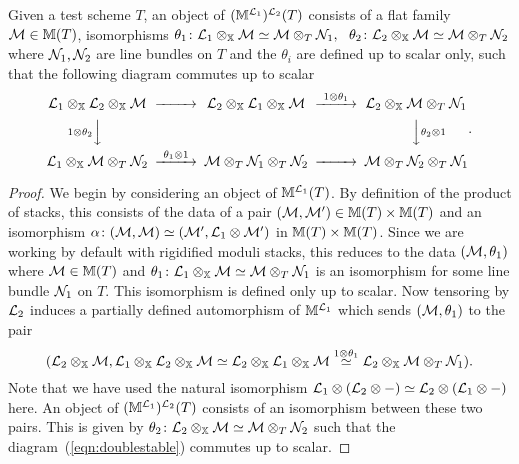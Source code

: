 \documentclass[12pt]{amsart}
\begin{document}
\begin{proposition}  \label{prop:doublestable}
Given a test scheme $T$, an object of $(\mathbb{M}^{\mathcal{L}_1})^{\mathcal{L}_2}(T)$ consists of a flat family $\mathcal{M} \in \mathbb{M}(T)$, isomorphisms $\theta_1 \colon \mathcal{L}_1 \otimes_{\mathbb{X}} \mathcal{M} \simeq \mathcal{M} \otimes_T \mathcal{N}_1, \ \ \theta_2 \colon \mathcal{L}_2 \otimes_{\mathbb{X}} \mathcal{M} \simeq \mathcal{M} \otimes_T \mathcal{N}_2$ where $\mathcal{N}_1, \mathcal{N}_2$ are line bundles on $T$ and the $\theta_i$ are defined up to scalar only, such that the following diagram commutes up to scalar
\begin{equation} \label{eqn:doublestable}
\begin{CD}
\cL_1 \otimes_{\bX} \cL_2 \otimes_{\bX} \cM @>>> \cL_2 \otimes_{\bX} \cL_1 \otimes_{\bX} \cM @>{1 \otimes \theta_1}>> \cL_2 \otimes_{\bX} \cM \otimes_T \cN_1 \\
@V{1 \otimes \theta_2}VV @. @VV{\theta_2 \otimes 1}V \\
\cL_1 \otimes_{\bX} \cM \otimes_T \cN_2 @>{\theta_1 \otimes 1}>> \cM \otimes_T \cN_1 \otimes_T \cN_2 @>>> 
\cM \otimes_T \cN_2 \otimes_T \cN_1
\end{CD}.
\end{equation}
\end{proposition}
\begin{proof}
We begin by considering an object of $\mathbb{M}^{\mathcal{L}_1}(T)$. By definition of the product of stacks, this consists of the data of a pair $(\mathcal{M}, \mathcal{M}') \in \mathbb{M}(T) \times\mathbb{M}(T)$ and an isomorphism $\alpha \colon (\mathcal{M}, \mathcal{M}) \simeq (\mathcal{M}', \mathcal{L}_1 \otimes \mathcal{M}')$ in $\mathbb{M}(T) \times \mathbb{M}(T)$. Since we are working by default with rigidified moduli stacks, this reduces to the data $(\mathcal{M}, \theta_1)$ where $\mathcal{M} \in \mathbb{M}(T)$ and $\theta_1 \colon \mathcal{L}_1 \otimes_{\mathbb{X}} \mathcal{M} \simeq \mathcal{M} \otimes_T \mathcal{N}_1$ is an isomorphism for some line bundle $\mathcal{N}_1$ on $T$. This isomorphism is defined only up to scalar. Now tensoring by $\mathcal{L}_2$ induces a partially defined automorphism of $\mathbb{M}^{\mathcal{L}_1}$ which sends $(\mathcal{M},\theta_1)$ to the pair 
$$(\mathcal{L}_2 \otimes_{\mathbb{X}} \mathcal{M}, \mathcal{L}_1 \otimes_{\mathbb{X}} \mathcal{L}_2 \otimes_{\mathbb{X}} \mathcal{M} \simeq \mathcal{L}_2 \otimes_{\mathbb{X}} \mathcal{L}_1 \otimes_{\mathbb{X}} \mathcal{M} \stackrel{1 \otimes \theta_1}{\simeq} \mathcal{L}_2 \otimes_{\mathbb{X}} \mathcal{M} \otimes_T \mathcal{N}_1).$$
Note that we have used the natural isomorphism $\mathcal{L}_1 \otimes (\mathcal{L}_2 \otimes -) \simeq \mathcal{L}_2 \otimes (\mathcal{L}_1 \otimes -)$ here. An object of $(\mathbb{M}^{\mathcal{L}_1})^{\mathcal{L}_2}(T)$ consists of an isomorphism between these two pairs. This is given by $\theta_2 \colon \mathcal{L}_2 \otimes_{\mathbb{X}} \mathcal{M} \simeq \mathcal{M} \otimes_T \mathcal{N}_2$ such that the diagram~(\ref{eqn:doublestable}) commutes up to scalar.
\end{proof}
\end{document}
